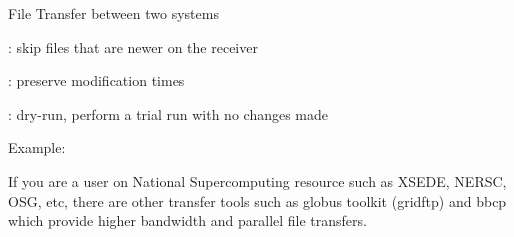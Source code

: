 \documentclass[10pt,t]{beamer}
\begin{document}
\begin{frame}{File Transfer between two systems}
\begin{itemize}
{      \item[] : skip files that are newer on the receiver
      \item[] : preserve modification times
      \item[] : dry-run, perform a trial run with no changes made
      }
      \item Example: 
      \item If you are a user on National Supercomputing resource such as XSEDE, NERSC, OSG, etc, there are other transfer tools such as globus toolkit (gridftp) and bbcp which provide higher bandwidth and parallel file transfers.
  \end{itemize}
\end{frame}
\end{document}
